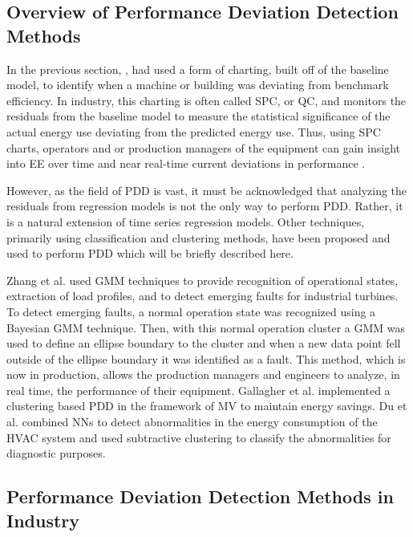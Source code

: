\subsection{Overview of Performance Deviation Detection Methods}

In the previous section, \cite{tightening}\cite{cas}\cite{boiler}, had used a form of charting, built off of the baseline model, to identify when a machine or building was deviating from benchmark efficiency. In industry, this charting is often called SPC, or \ac{QC}, and monitors the residuals from the baseline model to measure the statistical significance of the actual energy use deviating from the predicted energy use. Thus, using SPC charts, operators and or production managers of the equipment can gain insight into EE over time and near real-time current deviations in performance \cite{oakland_statistical_2008}.

However, as the field of PDD is vast, it must be acknowledged that analyzing the residuals from regression models is not the only way to perform PDD. Rather, it is a natural extension of time series regression models. Other techniques, primarily using classification and clustering methods, have been proposed and used to perform PDD which will be briefly described here.

Zhang et al. \cite{gas-turbine-faults} used GMM techniques to provide recognition of operational states, extraction of load profiles, and to detect emerging faults for industrial turbines. To detect emerging faults, a normal operation state was recognized using a Bayesian GMM technique. Then, with this normal operation cluster a GMM was used to define an ellipse boundary to the cluster and when a new data point fell outside of the ellipse boundary it was identified as a fault. This method, which is now in production, allows the production managers and engineers to analyze, in real time, the performance of their equipment. Gallagher et al. \cite{intelliMAV} implemented a clustering based PDD in the framework of \ac{MV} to maintain energy savings. Du et al. \cite{fault-HVAC} combined NNs to detect abnormalities in the energy consumption of the HVAC system and used subtractive clustering to classify the abnormalities for diagnostic purposes.

\subsection{Performance Deviation Detection Methods in Industry}

